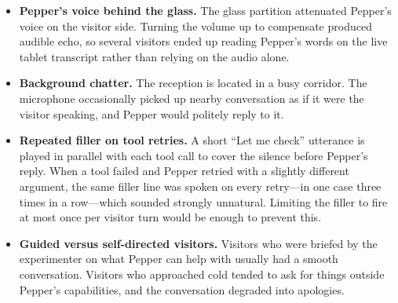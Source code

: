 \begin{itemize}
    \item \textbf{Pepper's voice behind the glass.} The glass partition attenuated Pepper's voice on the visitor side. Turning the volume up to compensate produced audible echo, so several visitors ended up reading Pepper's words on the live tablet transcript rather than relying on the audio alone.
    \item \textbf{Background chatter.} The reception is located in a busy corridor. The microphone occasionally picked up nearby conversation as if it were the visitor speaking, and Pepper would politely reply to it.
    \item \textbf{Repeated filler on tool retries.} A short ``Let me check'' utterance is played in parallel with each tool call to cover the silence before Pepper's reply. When a tool failed and Pepper retried with a slightly different argument, the same filler line was spoken on every retry---in one case three times in a row---which sounded strongly unnatural. Limiting the filler to fire at most once per visitor turn would be enough to prevent this.
    \item \textbf{Guided versus self-directed visitors.} Visitors who were briefed by the experimenter on what Pepper can help with usually had a smooth conversation. Visitors who approached cold tended to ask for things outside Pepper's capabilities, and the conversation degraded into apologies.
\end{itemize}


